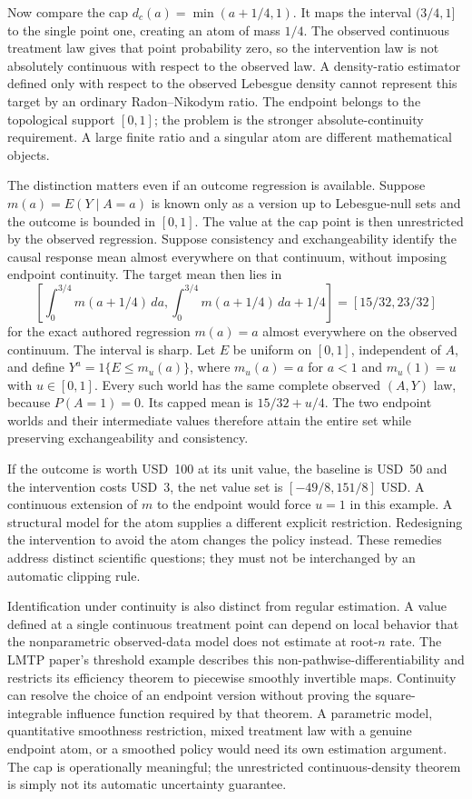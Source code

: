 Now compare the cap $d_c(a)=\min(a+1/4,1)$. It maps the
interval $(3/4,1]$ to the single point one, creating an atom of mass $1/4$.
The observed continuous treatment law gives that point probability zero, so
the intervention law is not absolutely continuous with respect to the observed
law. A density-ratio estimator defined only with respect to the observed
Lebesgue density cannot represent this target by an ordinary Radon--Nikodym
ratio. The endpoint belongs to the topological support $[0,1]$; the problem
is the stronger absolute-continuity requirement. A large finite ratio and a
singular atom are different mathematical objects.

The distinction matters even if an outcome regression is available. Suppose
$m(a)=E(Y\mid A=a)$ is known only as a version up to Lebesgue-null sets and
the outcome is bounded in $[0,1]$. The value at the cap point is then
unrestricted by the observed regression. Suppose consistency and
exchangeability identify the causal response mean almost everywhere on that
continuum, without imposing endpoint continuity. The target mean then lies in
\begin{equation}
 \left[\int_0^{3/4}m(a+1/4)\,da,
       \int_0^{3/4}m(a+1/4)\,da+1/4\right]
 = [15/32,23/32]
 \label{exec17:s5-cap-set}
 \end{equation}
for the exact authored regression $m(a)=a$ almost everywhere on the observed
continuum. The interval is sharp. Let $E$ be uniform on $[0,1]$, independent
of $A$, and define $Y^a=1\{E\leq m_u(a)\}$, where $m_u(a)=a$ for $a<1$ and
$m_u(1)=u$ with $u\in[0,1]$. Every such world has the same complete
observed $(A,Y)$ law, because $P(A=1)=0$. Its capped mean is
$15/32+u/4$. The two endpoint worlds and their intermediate values therefore
attain the entire set while preserving exchangeability and consistency.

If the outcome is worth USD~100 at its unit value, the baseline is USD~50 and the
intervention costs USD~3, the net value set is
$[-49/8,151/8]$ USD. A continuous extension of $m$ to the endpoint would
force $u=1$ in this example. A structural model for the atom supplies a
different explicit restriction. Redesigning the intervention to avoid the
atom changes the policy instead. These remedies address distinct scientific
questions; they must not be interchanged by an automatic clipping rule.
\citep{lmtp2023,exec17_s5_math}

Identification under continuity is also distinct from regular estimation.
A value defined at a single continuous treatment point can depend on local
behavior that the nonparametric observed-data model does not estimate at
root-$n$ rate. The LMTP paper's threshold example describes this
non-pathwise-differentiability and restricts its efficiency theorem to
piecewise smoothly invertible maps. Continuity can resolve the choice of an
endpoint version without proving the square-integrable influence function
required by that theorem. A parametric model, quantitative smoothness
restriction, mixed treatment law with a genuine endpoint atom, or a smoothed
policy would need its own estimation argument. The cap is operationally
meaningful; the unrestricted continuous-density theorem is simply not its
automatic uncertainty guarantee.~\citep{lmtp2023}

